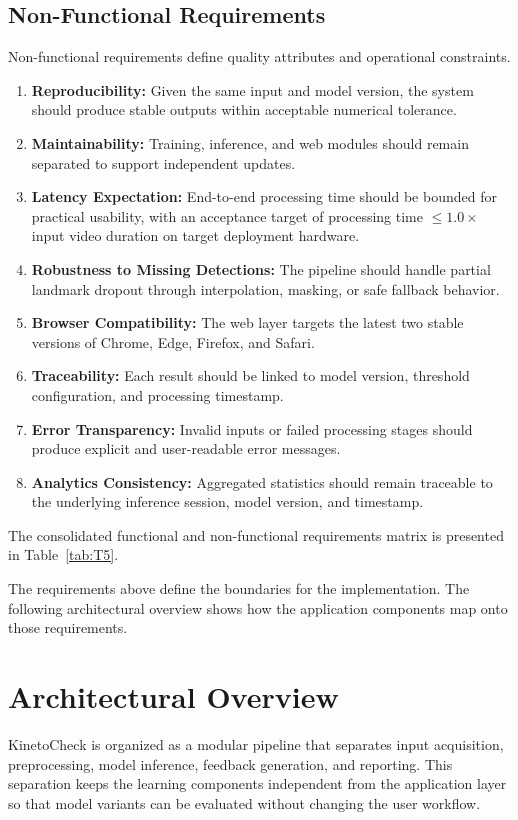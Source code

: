 \subsection{Non-Functional Requirements}
Non-functional requirements define quality attributes and operational constraints.
\begin{enumerate}
    \item \textbf{Reproducibility:} Given the same input and model version, the system should produce stable outputs within acceptable numerical tolerance.
    \item \textbf{Maintainability:} Training, inference, and web modules should remain separated to support independent updates.
    \item \textbf{Latency Expectation:} End-to-end processing time should be bounded for practical usability, with an acceptance target of processing time $\leq 1.0\times$ input video duration on target deployment hardware.
    \item \textbf{Robustness to Missing Detections:} The pipeline should handle partial landmark dropout through interpolation, masking, or safe fallback behavior.
    \item \textbf{Browser Compatibility:} The web layer targets the latest two stable versions of Chrome, Edge, Firefox, and Safari.
    \item \textbf{Traceability:} Each result should be linked to model version, threshold configuration, and processing timestamp.
    \item \textbf{Error Transparency:} Invalid inputs or failed processing stages should produce explicit and user-readable error messages.
    \item \textbf{Analytics Consistency:} Aggregated statistics should remain traceable to the underlying inference session, model version, and timestamp.
\end{enumerate}

The consolidated functional and non-functional requirements matrix is presented in Table~\ref{tab:T5}.




The requirements above define the boundaries for the implementation. The following architectural overview shows how the application components map onto those requirements.

\section{Architectural Overview}
KinetoCheck is organized as a modular pipeline that separates input acquisition, preprocessing, model inference, feedback generation, and reporting. This separation keeps the learning components independent from the application layer so that model variants can be evaluated without changing the user workflow.

